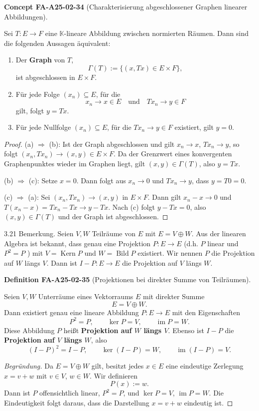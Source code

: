 \documentclass[10pt, letterpaper]{article}
\newcommand{\CustomHeading}[3]{%
  \par\medskip\noindent%
  \textbf{#1 #2} \textnormal{(#3)}.\enskip%
}
\newenvironment{DEF}[2]{\begin{unitbox}\CustomHeading{Definition}{#1}{#2}}{\end{unitbox}}
\newenvironment{CONC}[2]{\begin{unitbox}\CustomHeading{Concept}{#1}{#2}}{\end{unitbox}}
\begin{document}
\begin{CONC}{FA-A25-02-34}{Charakterisierung abgeschlossener Graphen linearer Abbildungen}
Sei $T:E\to F$ eine $\mathbb{K}$-lineare Abbildung zwischen normierten Räumen. Dann sind die folgenden Aussagen äquivalent:
\begin{enumerate}[label=(\alph*)]
\item Der \textbf{Graph} von $T$, 
\[
\Gamma(T):=\{(x,Tx)\in E\times F\},
\]
ist abgeschlossen in $E\times F$.
\item Für jede Folge $(x_n)\subseteq E$, für die 
\[
x_n\to x\in E \quad\text{und}\quad Tx_n\to y\in F
\]
gilt, folgt $y=Tx$.
\item Für jede Nullfolge $(x_n)\subseteq E$, für die $Tx_n\to y\in F$ existiert, gilt $y=0$.
\end{enumerate}


\begin{proof}
(a) $\Rightarrow$ (b): Ist der Graph abgeschlossen und gilt $x_n\to x$, $Tx_n\to y$, so folgt $(x_n,Tx_n)\to (x,y)\in E\times F$. 
Da der Grenzwert eines konvergenten Graphenpunktes wieder im Graphen liegt, gilt $(x,y)\in\Gamma(T)$, also $y=Tx$.

\smallskip
(b) $\Rightarrow$ (c): Setze $x=0$. Dann folgt aus $x_n\to 0$ und $Tx_n\to y$, dass $y=T0=0$.

\smallskip
(c) $\Rightarrow$ (a): Sei $(x_n,Tx_n)\to(x,y)$ in $E\times F$. 
Dann gilt $x_n-x\to 0$ und $T(x_n-x)=Tx_n-Tx\to y-Tx$. 
Nach (c) folgt $y-Tx=0$, also $(x,y)\in\Gamma(T)$ und der Graph ist abgeschlossen.
\end{proof}
\end{CONC}
  

3.21 Bemerkung. Seien $V, W$ Teilräume von $E$ mit $E=V \oplus W$. Aus der linearen Algebra ist bekannt, dass genau eine Projektion $P: E \rightarrow E$ (d.h. $P$ linear und $P^{2}=P$ ) mit $V=\operatorname{Kern} P$ und $W=\operatorname{Bild} P$ existiert. Wir nennen $P$ die Projektion auf $W$ längs $V$. Dann ist $I-P: E \rightarrow E$ die Projektion auf $V$ längs $W$.


\begin{DEF}{FA-A25-02-35}{Projektionen bei direkter Summe von Teilräumen}
Seien $V,W$ Unterräume eines Vektorraums $E$ mit direkter Summe 
\[
E = V \oplus W.
\]
Dann existiert genau eine lineare Abbildung $P:E\to E$ mit den Eigenschaften
\[
P^2 = P, \qquad \ker P = V, \qquad \operatorname{im} P = W.
\]
Diese Abbildung $P$ heißt \textbf{Projektion auf $W$ längs $V$}.
Ebenso ist $I - P$ die \textbf{Projektion auf $V$ längs $W$}, also
\[
(I-P)^2 = I-P, \qquad \ker (I-P) = W, \qquad \operatorname{im}(I-P) = V.
\]

\begin{proof}[Begründung]
Da $E=V\oplus W$ gilt, besitzt jedes $x\in E$ eine eindeutige Zerlegung 
$x = v + w$ mit $v\in V$, $w\in W$. 
Wir definieren 
\[
P(x) := w.
\]
Dann ist $P$ offensichtlich linear, $P^2 = P$, und 
$\ker P = V$, $\operatorname{im} P = W$. 
Die Eindeutigkeit folgt daraus, dass die Darstellung $x=v+w$ eindeutig ist.
\end{proof}
\end{DEF}
\end{document}
